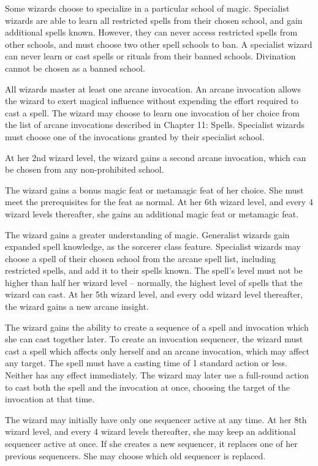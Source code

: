  Some wizards choose to specialize in a particular school of magic. Specialist wizards are able to learn all restricted spells from their chosen school, and gain additional spells known. However, they can never access restricted spells from other schools, and must choose two other spell schools to ban. A specialist wizard can never learn or cast spells or rituals from their banned schools. Divination cannot be chosen as a banned school.

 All wizards master at least one arcane invocation. An arcane invocation allows the wizard to exert magical influence without expending the effort required to cast a spell. The wizard may choose to learn one invocation of her choice from the list of arcane invocations described in Chapter 11: Spells. Specialist wizards must choose one of the invocations granted by their specialist school.

At her 2nd wizard level, the wizard gains a second arcane invocation, which can be chosen from any non-prohibited school.

 The wizard gains a bonus magic feat or metamagic feat of her choice. She must meet the prerequisites for the feat as normal. At her 6th wizard level, and every 4 wizard levels thereafter, she gains an additional magic feat or metamagic feat.

 The wizard gains a greater understanding of magic. Generalist wizards gain expanded spell knowledge, as the sorcerer class feature. Specialist wizards may choose a spell of their chosen school from the arcane spell list, including restricted spells, and add it to their spells known. The spell's level must not be higher than half her wizard level -- normally, the highest level of spells that the wizard can cast. At her 5th wizard level, and every odd wizard level thereafter, the wizard gains a new arcane insight.

 The wizard gains the ability to create a sequence of a spell and invocation which she can cast together later. To create an invocation sequencer, the wizard must cast a spell which affects only herself and an arcane invocation, which may affect any target. The spell must have a casting time of 1 standard action or less. Neither has any effect immediately. The wizard may later use a full-round action to cast both the spell and the invocation at once, choosing the target of the invocation at that time.
\par The wizard may initially have only one sequencer active at any time. At her 8th wizard level, and every 4 wizard levels thereafter, she may keep an additional sequencer active at once. If she creates a new sequencer, it replaces one of her previous sequencers. She may choose which old sequencer is replaced.

